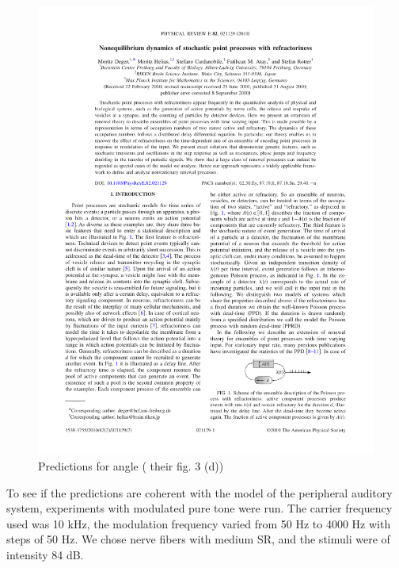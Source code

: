 \begin{figure}[h]
	\centering
	\includegraphics*[page=4,viewport=433 567 566 617]{images/Deger2010.pdf} %
	\caption{Predictions for angle (\cite{Deger} their fig. 3 (d))}
	\label{fig:predangle}
\end{figure}

To see if the predictions are coherent with the model of the peripheral auditory 
system, experiments with modulated pure tone were run. 
The carrier frequency used was 10 kHz, the modulation frequency varied from 50 Hz to 4000 Hz
with steps of 50 Hz. We chose nerve fibers with medium SR, 
and the stimuli were of intensity 84 dB.









 